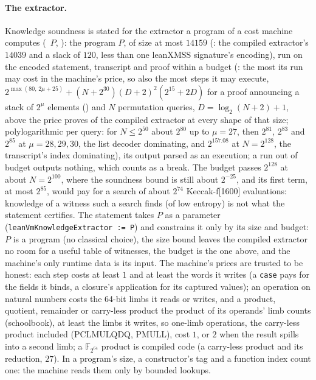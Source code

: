 \documentclass[11pt]{article}
\begin{document}
\paragraph{The extractor.} Knowledge soundness is stated for the extractor a program of a cost
machine computes (~$P$, ): the
program $P$, of size at most $14159$ (: the compiled
extractor's $14039$ and a slack of $120$, less than one leanXMSS signature's encoding), run on the encoded
statement, transcript and proof within a budget (: the most its
run may cost in the machine's price, so also the most steps it may execute,
$2^{\max(80,\,2\mu + 25)} + (N + 2^{30})(D + 2)^2(2^{15} + 2D)$ for a proof announcing a stack of $2^\mu$
elements () and $N$ permutation queries, $D = \log_2(N + 2) + 1$, above the
price  proves of the compiled extractor at every shape of that size; polylogarithmic
per query: for $N \le 2^{50}$ about $2^{80}$ up to $\mu = 27$, then $2^{81}$, $2^{83}$ and $2^{85}$ at $\mu = 28, 29, 30$, the list
decoder dominating, and $2^{157.08}$ at $N = 2^{128}$, the transcript's index dominating), its output
parsed as an execution; a run out of budget outputs nothing, which counts as a break. The budget
passes $2^{128}$ at about $N = 2^{100}$, where the soundness bound is still about $2^{-25}$, and its first
term, at most $2^{85}$, would pay for a search of about $2^{74}$ Keccak-f[1600] evaluations: knowledge
of a witness such a search finds
(of low entropy) is not what the statement certifies. The
statement takes $P$ as a parameter (\texttt{leanVmKnowledgeExtractor := P}) and constrains it only
by its size and budget: $P$ is a program (no classical choice), the size bound leaves the compiled
extractor no room for a useful table of witnesses, the budget is the one above, and the machine's
only runtime data is its input. The machine's prices are trusted to be honest: each step costs at
least $1$ and at least the words it writes (a \texttt{case} pays for the fields it binds, a
closure's application for its captured values); an operation on natural numbers costs the 64-bit
limbs it reads or writes, and a product, quotient, remainder or carry-less product the product of
its operands' limb counts (schoolbook), at least the limbs it writes, so one-limb operations, the
carry-less product included (PCLMULQDQ, PMULL), cost $1$, or $2$ when the result spills into a
second limb; a $\mathbb{F}_{2^{64}}$ product is compiled code (a carry-less product
and its reduction, $27$). In a program's size, a constructor's tag and a function index count one:
the machine reads them only by bounded lookups.
\end{document}
